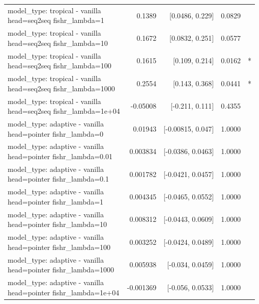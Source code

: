 \documentclass[10pt]{article}
\makeatletter
\newcommand{\stackcell}[1]{\begin{tabular}[t]{@{}l@{}}#1\end{tabular}}
\makeatother
\begin{document}
{\begin{longtable}{lrrrl}
\stackcell{model\_type: tropical - vanilla\\\footnotesize head=seq2seq fishr\_lambda=1 } & 0.1389 & [0.0486, 0.229] & 0.0829 & \\
\stackcell{model\_type: tropical - vanilla\\\footnotesize head=seq2seq fishr\_lambda=10 } & 0.1672 & [0.0832, 0.251] & 0.0577 & \\
\stackcell{model\_type: tropical - vanilla\\\footnotesize head=seq2seq fishr\_lambda=100 } & 0.1615 & [0.109, 0.214] & 0.0162 & *\\
\stackcell{model\_type: tropical - vanilla\\\footnotesize head=seq2seq fishr\_lambda=1000 } & 0.2554 & [0.143, 0.368] & 0.0441 & *\\
\stackcell{model\_type: tropical - vanilla\\\footnotesize head=seq2seq fishr\_lambda=1e+04 } & -0.05008 & [-0.211, 0.111] & 0.4355 & \\
\stackcell{model\_type: adaptive - vanilla\\\footnotesize head=pointer fishr\_lambda=0 } & 0.01943 & [-0.00815, 0.047] & 1.0000 & \\
\stackcell{model\_type: adaptive - vanilla\\\footnotesize head=pointer fishr\_lambda=0.01 } & 0.003834 & [-0.0386, 0.0463] & 1.0000 & \\
\stackcell{model\_type: adaptive - vanilla\\\footnotesize head=pointer fishr\_lambda=0.1 } & 0.001782 & [-0.0421, 0.0457] & 1.0000 & \\
\stackcell{model\_type: adaptive - vanilla\\\footnotesize head=pointer fishr\_lambda=1 } & 0.004345 & [-0.0465, 0.0552] & 1.0000 & \\
\stackcell{model\_type: adaptive - vanilla\\\footnotesize head=pointer fishr\_lambda=10 } & 0.008312 & [-0.0443, 0.0609] & 1.0000 & \\
\stackcell{model\_type: adaptive - vanilla\\\footnotesize head=pointer fishr\_lambda=100 } & 0.003252 & [-0.0424, 0.0489] & 1.0000 & \\
\stackcell{model\_type: adaptive - vanilla\\\footnotesize head=pointer fishr\_lambda=1000 } & 0.005938 & [-0.034, 0.0459] & 1.0000 & \\
\stackcell{model\_type: adaptive - vanilla\\\footnotesize head=pointer fishr\_lambda=1e+04 } & -0.001369 & [-0.056, 0.0533] & 1.0000 & \\

\end{longtable}}
\end{document}
